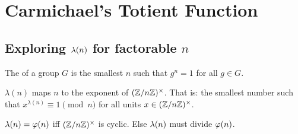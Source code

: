 \section{Carmichael's Totient Function}

\subsection{Exploring $\lambdaf{n}$ for factorable $n$}

\begin{definition}
  The  of a group $G$ is the smallest $n$ such that
  $g^n = 1$ for all $g \in G$.
\end{definition}

\begin{definition}
   $\lambda(n)$ maps $n$ to the
  exponent of $\Zmodnx$. That is: the smallest number such that
  $x^{\lambda(n)} \equiv 1 \pmod{n}$ for all units $x \in \Zmodnx$.
\end{definition}

\begin{proposition}
  $\lambdaf{n} = \vphif{n}$ iff $\Zmodnx$ is cyclic. Else $\lambdaf{n}$
  must divide $\vphif{n}$.
\end{proposition}

\begin{theorem}
  \begin{nedqn}
  \eqcol
    \lcm{}
  \end{nedqn}
\end{theorem}

